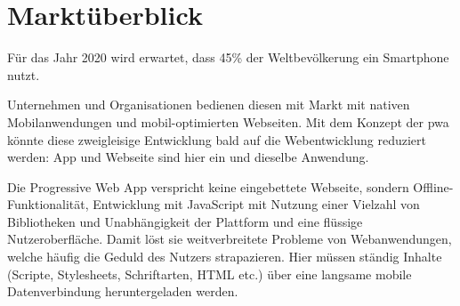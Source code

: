 \section{Marktüberblick}

Für das Jahr 2020 wird erwartet, dass 45\% der Weltbevölkerung ein Smartphone nutzt.
\cite{StatistaSmartphonesWorldwide}
\cite{StatistaWorldPopulation}

Unternehmen und Organisationen bedienen diesen mit Markt mit nativen Mobilanwendungen und mobil-optimierten Webseiten.
Mit dem Konzept der \ac{pwa} könnte diese zweigleisige Entwicklung bald auf die Webentwicklung reduziert werden: App und Webseite sind hier ein und dieselbe Anwendung. 


Die Progressive Web App verspricht keine eingebettete Webseite, sondern Offline-Funktionalität, Entwicklung mit JavaScript mit Nutzung einer Vielzahl von Bibliotheken und Unabhängigkeit der Plattform und eine flüssige Nutzeroberfläche. Damit löst sie weitverbreitete Probleme von Webanwendungen, welche häufig die Geduld des Nutzers strapazieren. Hier müssen ständig Inhalte (Scripte, Stylesheets, Schriftarten, HTML etc.) über eine langsame mobile Datenverbindung heruntergeladen werden.

